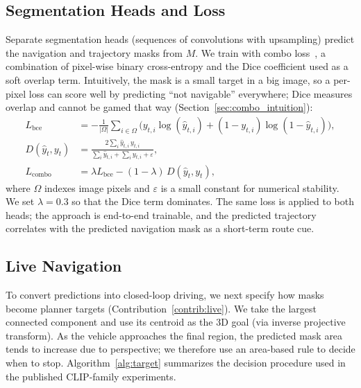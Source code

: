 \subsection{Segmentation Heads and Loss}

Separate segmentation heads (sequences of convolutions with upsampling) predict the navigation and trajectory masks from $M$. We train with combo loss~\cite{taghanaki2019combo}, a combination of pixel-wise binary cross-entropy and the Dice coefficient used as a soft overlap term. Intuitively, the mask is a small target in a big image, so a per-pixel loss can score well by predicting ``not navigable'' everywhere; Dice measures overlap and cannot be gamed that way (Section~\ref{sec:combo_intuition}):
\begin{equation} \label{eq:combo_loss}
\begin{split}
    L_{\mathrm{bce}} &= -\frac{1}{|\Omega|}\sum_{i \in \Omega}\bigl(y_{t,i}\log(\hat{y}_{t,i}) + (1 - y_{t,i})\log(1 - \hat{y}_{t,i})\bigr),\\
    D(\hat{y}_{t}, y_{t}) &= \frac{2\sum_{i}\hat{y}_{t,i}\, y_{t,i}}{\sum_{i}\hat{y}_{t,i} + \sum_{i} y_{t,i} + \varepsilon},\\
    L_{\mathrm{combo}} &= \lambda L_{\mathrm{bce}} - (1 - \lambda)\, D(\hat{y}_{t}, y_{t}),
\end{split}
\end{equation}
where $\Omega$ indexes image pixels and $\varepsilon$ is a small constant for numerical stability. We set $\lambda = 0.3$ so that the Dice term dominates. The same loss is applied to both heads; the approach is end-to-end trainable, and the predicted trajectory correlates with the predicted navigation mask as a short-term route cue.

\subsection{Live Navigation}
\label{sec:live_nav}

To convert predictions into closed-loop driving, we next specify how masks become planner targets (Contribution~\ref{contrib:live}). We take the largest connected component and use its centroid as the 3D goal (via inverse projective transform). As the vehicle approaches the final region, the predicted mask area tends to increase due to perspective; we therefore use an area-based rule to decide when to stop. Algorithm~\ref{alg:target} summarizes the decision procedure used in the published CLIP-family experiments.

